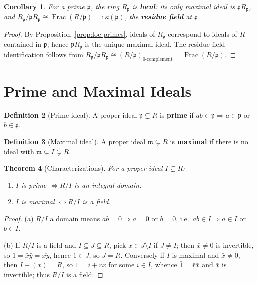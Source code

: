 \documentclass[11pt,a4paper]{article}
\newtheorem{theorem}{Theorem}[section]
\newtheorem{corollary}[theorem]{Corollary}
\theoremstyle{definition}
\newtheorem{definition}[theorem]{Definition}
\newcommand{\Frac}{\operatorname{Frac}}
\newcommand{\p}{\mathfrak{p}}
\newcommand{\m}{\mathfrak{m}}
\begin{document}
	\begin{corollary}\label{cor:local}
		For a prime $\p$, the ring $R_\p$ is \textbf{local}: its only maximal ideal is $\p R_\p$, and
		$R_\p/\p R_\p\cong\Frac(R/\p)=:\kappa(\p)$, the \textbf{residue field} at $\p$.
	\end{corollary}
	\begin{proof}
		By Proposition~\ref{prop:loc-primes}, ideals of $R_\p$ correspond to ideals of $R$ contained in $\p$;
		hence $\p R_\p$ is the unique maximal ideal. The residue field identification follows from
		$R_\p/\p R_\p\cong (R/\p)_{\bar0\text{-complement}}=\Frac(R/\p)$.
	\end{proof}
	
	\section{Prime and Maximal Ideals}
	
	\begin{definition}[Prime ideal]
		A proper ideal $\p\subsetneq R$ is \textbf{prime} if $ab\in\p\Rightarrow a\in\p$ or $b\in\p$.
	\end{definition}
	\begin{definition}[Maximal ideal]
		A proper ideal $\m\subsetneq R$ is \textbf{maximal} if there is no ideal with $\m\subsetneq I\subsetneq R$.
	\end{definition}
	
	\begin{theorem}[Characterizations]\label{thm:prime-max}
		For a proper ideal $I\subsetneq R$:
		\begin{enumerate}[label=(\alph*)]
			\item $I$ is prime $\iff R/I$ is an integral domain.
			\item $I$ is maximal $\iff R/I$ is a field.
		\end{enumerate}
	\end{theorem}
	\begin{proof}
		(a) $R/I$ a domain means $\bar a\bar b=0\Rightarrow\bar a=0$ or $\bar b=0$, i.e.\
		$ab\in I\Rightarrow a\in I$ or $b\in I$.
		
		(b) If $R/I$ is a field and $I\subseteq J\subseteq R$, pick $x\in J\setminus I$ if $J\neq I$; then
		$\bar x\neq0$ is invertible, so $1=\bar x\bar y=\overline{xy}$, hence $1\in J$, so $J=R$.
		Conversely if $I$ is maximal and $\bar x\neq0$, then $I+(x)=R$, so $1=i+rx$ for some $i\in I$,
		whence $\bar1=\bar r\bar x$ and $\bar x$ is invertible; thus $R/I$ is a field.
	\end{proof}
	
\end{document}
